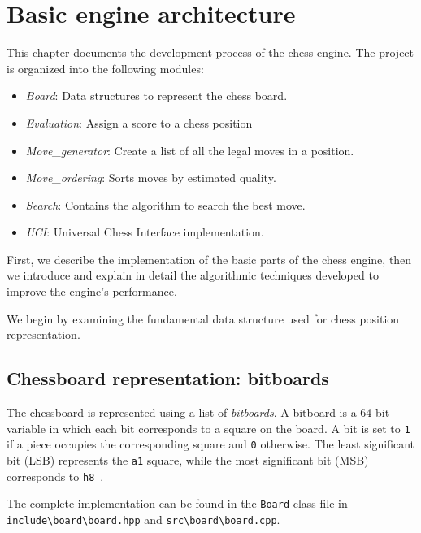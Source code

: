 \chapter{Basic engine architecture}\label{cap:descripcionTrabajo}

This chapter documents the development process of the chess engine. The project is organized into the following modules:

\begin{itemize}[itemsep=1pt]
    \item \textit{Board}: Data structures to represent the chess board.
    \item \textit{Evaluation}: Assign a score to a chess position
    \item \textit{Move\_generator}: Create a list of all the legal moves in a position.
    \item \textit{Move\_ordering}: Sorts moves by estimated quality.
    \item \textit{Search}: Contains the algorithm to search the best move.
    \item \textit{UCI}: Universal Chess Interface implementation.
\end{itemize}

\noindent First, we describe the implementation of the basic parts of the chess engine, then we introduce and explain in detail the algorithmic techniques developed to improve the engine's performance.

\vspace{1em}

\noindent We begin by examining the fundamental data structure used for chess position representation.

\section{Chessboard representation: bitboards}

\noindent The chessboard is represented using a list of \textit{bitboards}. A bitboard is a 64-bit variable in which each bit corresponds to a square on the board. A bit is set to \texttt{1} if a piece occupies the corresponding square and \texttt{0} otherwise. The least significant bit (LSB) represents the \texttt{a1} square, while the most significant bit (MSB) corresponds to \texttt{h8}~\cite{Bitboards}.
 
\vspace{1em}

\noindent \parbox{\textwidth}{The complete implementation can be found in the \texttt{Board} class file in \texttt{include\textbackslash{}board\textbackslash{}board.hpp} and \texttt{src\textbackslash{}board\textbackslash{}board.cpp}.}

